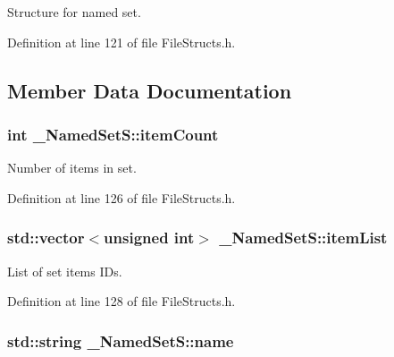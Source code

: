 Structure for named set. 

Definition at line 121 of file File\+Structs.\+h.



\subsection{Member Data Documentation}
\subsubsection[{\texorpdfstring{item\+Count}{itemCount}}]{\setlength{\rightskip}{0pt plus 5cm}int \+\_\+\+Named\+Set\+S\+::item\+Count}\hypertarget{struct___named_set_s_a2453a0c4e55b896ee5aca2df8ad95ee1}{}\label{struct___named_set_s_a2453a0c4e55b896ee5aca2df8ad95ee1}


Number of items in set. 



Definition at line 126 of file File\+Structs.\+h.

\subsubsection[{\texorpdfstring{item\+List}{itemList}}]{\setlength{\rightskip}{0pt plus 5cm}std\+::vector$<$unsigned int$>$ \+\_\+\+Named\+Set\+S\+::item\+List}\hypertarget{struct___named_set_s_abc51fae38f5fbec8cd241f03bc753016}{}\label{struct___named_set_s_abc51fae38f5fbec8cd241f03bc753016}


List of set items I\+Ds. 



Definition at line 128 of file File\+Structs.\+h.

\subsubsection[{\texorpdfstring{name}{name}}]{\setlength{\rightskip}{0pt plus 5cm}std\+::string \+\_\+\+Named\+Set\+S\+::name}\hypertarget{struct___named_set_s_a4490e74ce159285c8cf682c298627261}{}\label{struct___named_set_s_a4490e74ce159285c8cf682c298627261}


